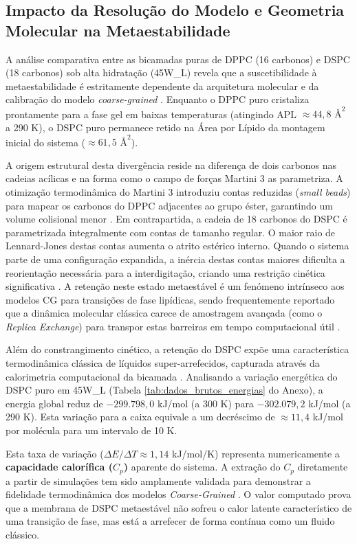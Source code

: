 \documentclass[12pt]{article} %
\begin{document}
\subsection{Impacto da Resolução do Modelo e Geometria Molecular na Metaestabilidade}

A análise comparativa entre as bicamadas puras de DPPC (16 carbonos) e DSPC (18 carbonos) sob alta hidratação (45W\_L) revela que a suscetibilidade à metaestabilidade é estritamente dependente da arquitetura molecular e da calibração do modelo \textit{coarse-grained} \cite{ramirez2025}. Enquanto o DPPC puro cristaliza prontamente para a fase gel em baixas temperaturas (atingindo APL $\approx 44,8 \text{ \AA}^2$ a 290 K), o DSPC puro permanece retido na Área por Lípido da montagem inicial do sistema ($\approx 61,5 \text{ \AA}^2$). 

A origem estrutural desta divergência reside na diferença de dois carbonos nas cadeias acílicas e na forma como o campo de forças Martini 3 as parametriza. A otimização termodinâmica do Martini 3 introduziu contas reduzidas (\textit{small beads}) para mapear os carbonos do DPPC adjacentes ao grupo éster, garantindo um volume colisional menor \cite{marrink2022, ramirez2025}. Em contrapartida, a cadeia de 18 carbonos do DSPC é parametrizada integralmente com contas de tamanho regular. O maior raio de Lennard-Jones destas contas aumenta o atrito estérico interno. Quando o sistema parte de uma configuração expandida, a inércia destas contas maiores dificulta a reorientação necessária para a interdigitação, criando uma restrição cinética significativa \cite{ramirez2025}. A retenção neste estado metaestável é um fenómeno intrínseco aos modelos CG para transições de fase lipídicas, sendo frequentemente reportado que a dinâmica molecular clássica carece de amostragem avançada (como o \textit{Replica Exchange}) para transpor estas barreiras em tempo computacional útil \cite{piskulich2022}.

Além do constrangimento cinético, a retenção do DSPC expõe uma característica termodinâmica clássica de líquidos super-arrefecidos, capturada através da calorimetria computacional da bicamada \cite{rodgers2012}. Analisando a variação energética do DSPC puro em 45W\_L (Tabela \ref{tab:dados_brutos_energias} do Anexo), a energia global reduz de $-299.798,0$ kJ/mol (a 300 K) para $-302.079,2$ kJ/mol (a 290 K). Esta variação para a caixa equivale a um decréscimo de $\approx 11,4$ kJ/mol por molécula para um intervalo de 10 K. 

Esta taxa de variação ($\Delta E / \Delta T \approx 1,14$ kJ/mol/K) representa numericamente a \textbf{capacidade calorífica ($C_p$)} aparente do sistema. A extração do $C_p$ diretamente a partir de simulações tem sido amplamente validada para demonstrar a fidelidade termodinâmica dos modelos \textit{Coarse-Grained} \cite{rodgers2012}. O valor computado prova que a membrana de DSPC metaestável não sofreu o calor latente característico de uma transição de fase, mas está a arrefecer de forma contínua como um fluido clássico.
\end{document}
